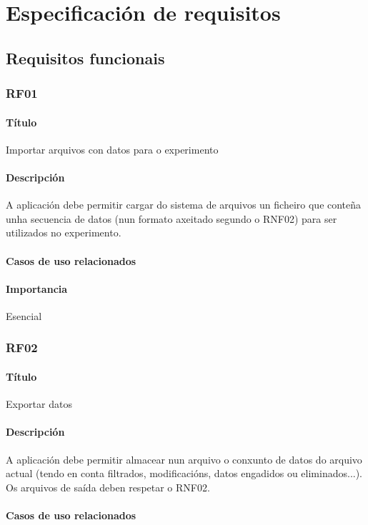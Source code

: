 \chapter{Especificación de requisitos}

\section{Requisitos funcionais}

\subsection{RF01}
\subsubsection{Título}
Importar arquivos con datos para o experimento
\subsubsection{Descripción}
A aplicación debe permitir cargar do sistema de arquivos un ficheiro que conteña unha secuencia de datos (nun formato axeitado segundo o RNF02) para ser utilizados no experimento.
\subsubsection{Casos de uso relacionados}
\subsubsection{Importancia}
Esencial

\subsection{RF02}
\subsubsection{Título}
Exportar datos
\subsubsection{Descripción}
A aplicación debe permitir almacear nun arquivo o conxunto de datos do arquivo actual (tendo en conta filtrados, modificacións, datos engadidos ou eliminados...). Os arquivos de saída deben respetar o RNF02.
\subsubsection{Casos de uso relacionados}
